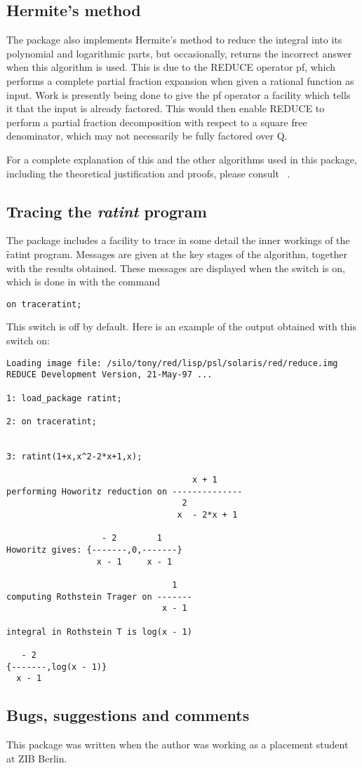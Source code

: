 \subsection{Hermite's method}
The package also implements Hermite's method to reduce the integral into its polynomial and logarithmic parts, but occasionally, \REDUCE returns the incorrect answer when this algorithm is used. This is due to the REDUCE operator pf, which performs a complete partial fraction expansion when given a rational function as input. Work is presently being done to give the pf operator a facility which tells it that the input is already factored. This would then enable REDUCE to perform a partial fraction decomposition with respect to a square free denominator, which may not necessarily be fully factored over Q.

For a complete explanation of this and the other algorithms used in this package, including the theoretical justification and proofs, please consult ~\cite{Geddes:92}.

\subsection{Tracing the \emph{ratint} program}
The package includes a facility to trace in some detail the inner workings of the \f{ratint} program. Messages are given at the key stages of the algorithm, together with the results obtained. These messages are displayed when the switch  is on, which is done in \REDUCE with the command
\hypertarget{switch:TRACERATINT}{}
\begin{verbatim}
on traceratint;
\end{verbatim}
This switch is off by default. Here is an example of the output obtained with this switch on:

\begin{verbatim}
Loading image file: /silo/tony/red/lisp/psl/solaris/red/reduce.img
REDUCE Development Version, 21-May-97 ...

1: load_package ratint;

2: on traceratint;


3: ratint(1+x,x^2-2*x+1,x);

                                     x + 1
performing Howoritz reduction on --------------
                                   2
                                  x  - 2*x + 1

                   - 2        1
Howoritz gives: {-------,0,-------}
                  x - 1     x - 1

                                 1
computing Rothstein Trager on -------
                               x - 1

integral in Rothstein T is log(x - 1)

   - 2
{-------,log(x - 1)}
  x - 1
\end{verbatim}

\subsection{Bugs, suggestions and comments}
This package was written when the author was working as a placement student at ZIB Berlin.
